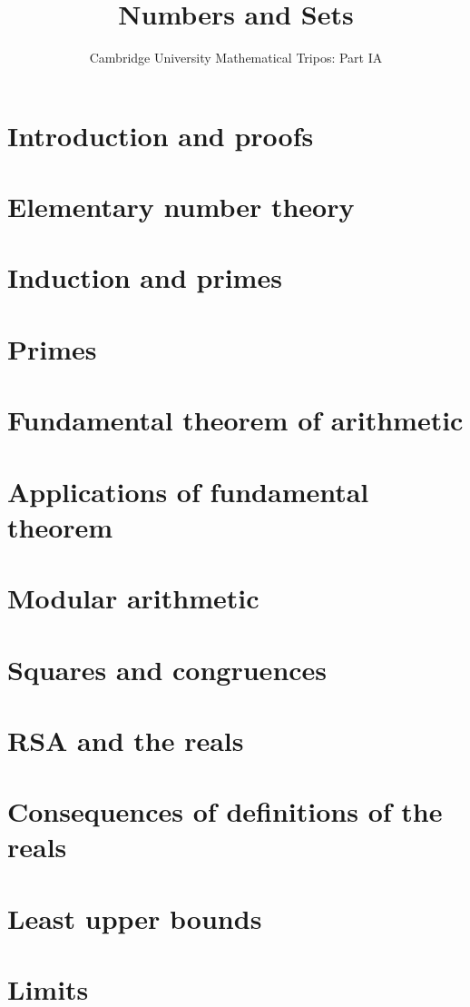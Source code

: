 \documentclass{article}
\title{Numbers and Sets}
\author{Cambridge University Mathematical Tripos: Part IA}
\begin{document}
\maketitle

\tableofcontentsnewpage{}

\section{Introduction and proofs}

\section{Elementary number theory}

\section{Induction and primes}

\section{Primes}

\section{Fundamental theorem of arithmetic}

\section{Applications of fundamental theorem}

\section{Modular arithmetic}

\section{Squares and congruences}

\section{RSA and the reals}

\section{Consequences of definitions of the reals}

\section{Least upper bounds}

\section{Limits}

\end{document}
